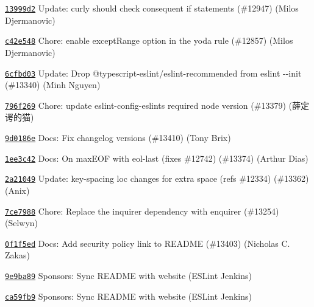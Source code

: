 \begin{DoxyItemize}
\item \href{https://github.com/eslint/eslint/commit/13999d292080f814fa4fb266e011d61c184197c4}{\texttt{ {\ttfamily 13999d2}}} Update\+: curly should check consequent {\ttfamily if} statements (\#12947) (Milos Djermanovic)
\item \href{https://github.com/eslint/eslint/commit/c42e54893b79b470ca7745bd2a626ffd069e017b}{\texttt{ {\ttfamily c42e548}}} Chore\+: enable except\+Range option in the yoda rule (\#12857) (Milos Djermanovic)
\item \href{https://github.com/eslint/eslint/commit/6cfbd03b3f22edb4d1c9c61c64eea7c129da71aa}{\texttt{ {\ttfamily 6cfbd03}}} Update\+: Drop @typescript-\/eslint/eslint-\/recommended from {\ttfamily eslint -\/-\/init} (\#13340) (Minh Nguyen)
\item \href{https://github.com/eslint/eslint/commit/796f269e448fdcbf8a5a62edf1990bd857efd1af}{\texttt{ {\ttfamily 796f269}}} Chore\+: update eslint-\/config-\/eslint\textquotesingle{}s required node version (\#13379) (薛定谔的猫)
\item \href{https://github.com/eslint/eslint/commit/9d0186e55bee769ea6aa08dc5a62682f58316412}{\texttt{ {\ttfamily 9d0186e}}} Docs\+: Fix changelog versions (\#13410) (Tony Brix)
\item \href{https://github.com/eslint/eslint/commit/1ee3c42ceeee56b650bcc4206ed783b795f65643}{\texttt{ {\ttfamily 1ee3c42}}} Docs\+: On max\+EOF with eol-\/last (fixes \#12742) (\#13374) (Arthur Dias)
\item \href{https://github.com/eslint/eslint/commit/2a210499288ed14ec9a6fd72decabfb77504c197}{\texttt{ {\ttfamily 2a21049}}} Update\+: key-\/spacing loc changes for extra space (refs \#12334) (\#13362) (Anix)
\item \href{https://github.com/eslint/eslint/commit/7ce7988f411da64248a64a9d9d2b7884d5ba39e0}{\texttt{ {\ttfamily 7ce7988}}} Chore\+: Replace the inquirer dependency with enquirer (\#13254) (Selwyn)
\item \href{https://github.com/eslint/eslint/commit/0f1f5ed2a20b8fb575d4360316861cf4c2b9b7bc}{\texttt{ {\ttfamily 0f1f5ed}}} Docs\+: Add security policy link to README (\#13403) (Nicholas C. Zakas)
\item \href{https://github.com/eslint/eslint/commit/9e9ba897c566601cfe90522099c635ea316b235f}{\texttt{ {\ttfamily 9e9ba89}}} Sponsors\+: Sync README with website (ESLint Jenkins)
\item \href{https://github.com/eslint/eslint/commit/ca59fb95a395c0a02ed23768a70e086480ab1f6d}{\texttt{ {\ttfamily ca59fb9}}} Sponsors\+: Sync README with website (ESLint Jenkins)
\end{DoxyItemize}

